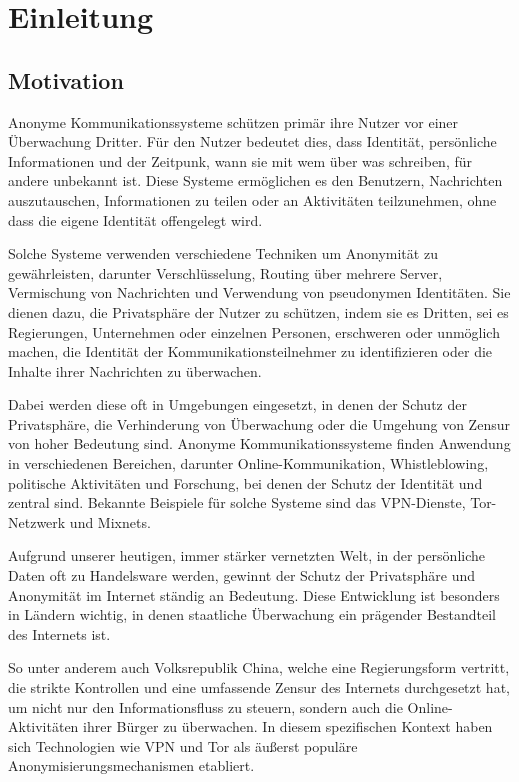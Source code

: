 \section{Einleitung}

\subsection{Motivation}

Anonyme Kommunikationssysteme schützen primär ihre Nutzer vor einer Überwachung Dritter. Für den Nutzer bedeutet dies, dass Identität, persönliche Informationen und der Zeitpunk, wann sie mit wem über was schreiben, für andere unbekannt ist. Diese Systeme ermöglichen es den Benutzern, Nachrichten auszutauschen, Informationen zu teilen oder an Aktivitäten teilzunehmen, ohne dass die eigene Identität offengelegt wird.

Solche Systeme verwenden verschiedene Techniken um Anonymität zu gewährleisten, darunter Verschlüsselung, Routing über mehrere Server, Vermischung von Nachrichten und Verwendung von pseudonymen Identitäten. Sie dienen dazu, die Privatsphäre der Nutzer zu schützen, indem sie es Dritten, sei es Regierungen, Unternehmen oder einzelnen Personen, erschweren oder unmöglich machen, die Identität der Kommunikationsteilnehmer zu identifizieren oder die Inhalte ihrer Nachrichten zu überwachen.

Dabei werden diese oft in Umgebungen eingesetzt, in denen der Schutz der Privatsphäre, die Verhinderung von Überwachung oder die Umgehung von Zensur von hoher Bedeutung sind. Anonyme Kommunikationssysteme finden Anwendung in verschiedenen Bereichen, darunter Online-Kommunikation, Whistleblowing, politische Aktivitäten und Forschung, bei denen der Schutz der Identität und zentral sind. Bekannte Beispiele für solche Systeme sind das VPN-Dienste, Tor-Netzwerk und Mixnets.

Aufgrund unserer heutigen, immer stärker vernetzten Welt, in der persönliche Daten oft zu Handelsware werden, gewinnt der Schutz der Privatsphäre und Anonymität im Internet ständig an Bedeutung. Diese Entwicklung ist besonders in Ländern wichtig, in denen staatliche Überwachung ein prägender Bestandteil des Internets ist.

So unter anderem auch Volksrepublik China, welche eine Regierungsform vertritt, die strikte Kontrollen und eine umfassende Zensur des Internets durchgesetzt hat, um nicht nur den Informationsfluss zu steuern, sondern auch die Online-Aktivitäten ihrer Bürger zu überwachen. In diesem spezifischen Kontext haben sich Technologien wie VPN und Tor als äußerst populäre Anonymisierungsmechanismen etabliert.

